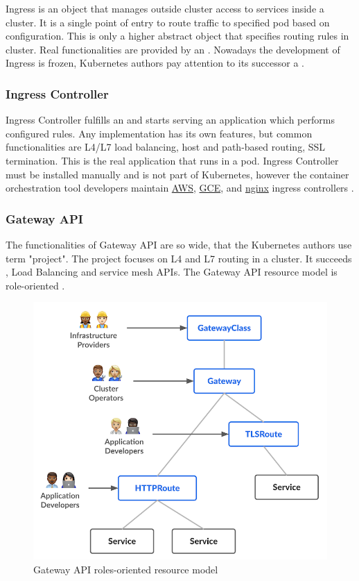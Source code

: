 Ingress is an object that manages outside cluster access to services inside a cluster. It is a single point of entry to route traffic to specified pod based on configuration. This is only a higher abstract object that specifies routing rules in cluster. Real functionalities are provided by an \textit{}. Nowadays the development of Ingress is frozen, Kubernetes authors pay attention to its successor a \textit{} \cite{KubernetesIngress}.

\subsubsection{Ingress Controller}
\label{ingresscontroller}

Ingress Controller fulfills an \textit{} and starts serving an application which performs configured rules. Any implementation has its own features, but common functionalities are L4/L7 load balancing, host and path-based routing, SSL termination. This is the real application that runs in a pod. Ingress Controller must be installed manually and is not part of Kubernetes, however the container orchestration tool developers maintain \href{https://github.com/kubernetes-sigs/aws-load-balancer-controller#readme}{AWS}, \href{https://github.com/kubernetes/ingress-gce/blob/master/README.md#readme}{GCE}, and \href{https://github.com/kubernetes/ingress-nginx/blob/main/README.md#readme}{nginx} ingress controllers \cite{KubernetesIngress}\cite{KubernetesIngressControllers}. 


\subsubsection{Gateway API}
\label{gatewayapi}

The functionalities of Gateway API are so wide, that the Kubernetes authors use term "project". The project focuses on L4 and L7 routing in a cluster. It succeeds \textit{}, Load Balancing and service mesh APIs. The Gateway API resource model is role-oriented \cite{KubernetesGatewayAPI}.

\begin{figure}[tbh]
    \centering
    \includegraphics[width=0.7\columnwidth]{images/gateway-api-resource-model.png}
    \caption{Gateway API roles-oriented resource model \cite{KubernetesGatewayAPI}}
    \label{fig:gatewayApiResourceModel}
\end{figure}


